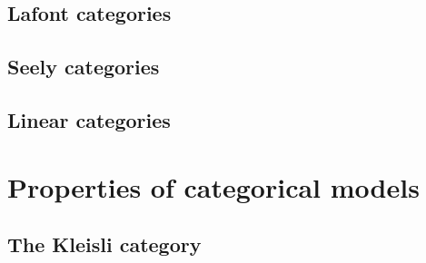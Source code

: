 \subsection{Lafont categories}\label{lafont-categories}

\subsection{Seely categories}\label{seely-categories}

\subsection{Linear categories}\label{linear-categories}

\section{Properties of categorical models}\label{properties-of-categorical-models}

\subsection{The Kleisli category}\label{the-kleisli-category}

